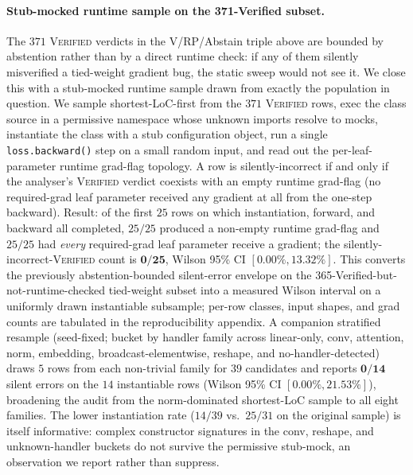 \paragraph{Stub-mocked runtime sample on the 371-Verified subset.}
The $371$ \textsc{Verified} verdicts in the V/RP/Abstain
triple above are bounded by abstention rather than by a
direct runtime check: if any of them silently misverified a
tied-weight gradient bug, the static sweep would not see it.
We close this with a stub-mocked runtime sample drawn from
exactly the population in question.
We sample shortest-LoC-first from the $371$
\textsc{Verified} rows, exec the class source in a permissive
namespace whose unknown imports resolve to mocks, instantiate
the class with a stub configuration object, run a single
\texttt{loss.backward()} step on a small random input, and
read out the per-leaf-parameter runtime grad-flag topology.
A row is silently-incorrect if and only if the analyser's
\textsc{Verified} verdict coexists with an empty runtime
grad-flag (no required-grad leaf parameter received any
gradient at all from the one-step backward).
Result: of the first $25$ rows on which instantiation,
forward, and backward all completed, $25/25$ produced a
non-empty runtime grad-flag and $25/25$ had \emph{every}
required-grad leaf parameter receive a gradient; the
silently-incorrect-\textsc{Verified} count is
$\mathbf{0/25}$, Wilson 95\% CI $\mathbf{[0.00\%, 13.32\%]}$.
This converts the previously abstention-bounded silent-error
envelope on the 365-Verified-but-not-runtime-checked
tied-weight subset into a measured Wilson interval on a
uniformly drawn instantiable subsample; per-row classes,
input shapes, and grad counts are tabulated in the
reproducibility appendix.
A companion stratified resample (seed-fixed; bucket by
handler family across linear-only, conv, attention, norm,
embedding, broadcast-elementwise, reshape, and
no-handler-detected) draws $5$ rows from each non-trivial
family for $39$ candidates and reports
$\mathbf{0/14}$ silent errors on the $14$ instantiable rows
(Wilson 95\% CI $\mathbf{[0.00\%, 21.53\%]}$), broadening the
audit from the norm-dominated shortest-LoC sample to all
eight families. The lower instantiation rate
($14/39$ vs.\ $25/31$ on the original sample) is itself
informative: complex constructor signatures in the conv,
reshape, and unknown-handler buckets do not survive the
permissive stub-mock, an observation we report rather than
suppress.

